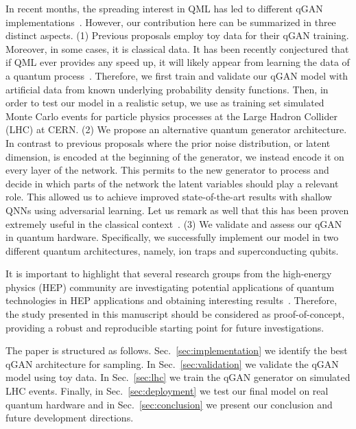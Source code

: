 \documentclass[twocolumn,preprintnumbers,superscriptaddress]{revtex4-2}
\begin{document}
In recent months, the spreading interest in QML has led to different qGAN
implementations~\cite{zoufal2019quantum, zeng2019learning, situ2020quantum,
  hu2019quantum, benedetti2019adversarial, romero2021variational,
  niu2021entangling}. However, our contribution here can be summarized in three
distinct aspects. (1) Previous proposals employ toy data for their qGAN
training. Moreover, in some cases, it is classical data. It has been recently
conjectured that if QML ever provides any speed up, it will likely appear from
learning the data of a quantum process~\cite{huang2021information,
  kubler2021inductive}. Therefore, we first train and validate our qGAN model with
artificial data from known underlying probability density functions. Then, in
order to test our model in a realistic setup, we use as training set simulated
Monte Carlo events for particle physics processes at the Large Hadron Collider
(LHC) at CERN. (2) We propose an alternative quantum generator architecture. In contrast to
previous proposals where the prior noise distribution, or latent dimension, is
encoded at the beginning of the generator, we instead encode it on every layer
of the network. This permits to the new generator to process and decide in which
parts of the network the latent variables should play a relevant role. This
allowed us to achieve improved state-of-the-art results with shallow QNNs using
adversarial learning. Let us remark as well that this has been proven extremely
useful in the classical context~\cite{karras2019style}. (3) We validate and
assess our qGAN in quantum hardware. Specifically, we successfully implement our
model in two different quantum architectures, namely, ion traps and
superconducting qubits.

It is important to highlight that several research groups from the high-energy
physics (HEP) community are investigating potential applications of quantum
technologies in HEP applications and obtaining interesting
results~\cite{P_rez_Salinas_2021,Guan_2021,chang2021quantum,Chang_2021,Belis_2021,khattak2021fast}.
Therefore, the study presented in this manuscript should be considered as
proof-of-concept, providing a robust and reproducible starting point for future
investigations.

The paper is structured as follows. Sec.~\ref{sec:implementation} we identify
the best qGAN architecture for sampling. In Sec.~\ref{sec:validation} we
validate the qGAN model using toy data. In Sec.~\ref{sec:lhc} we train the qGAN
generator on simulated LHC events. Finally, in Sec.~\ref{sec:deployment} we test
our final model on real quantum hardware and in Sec.~\ref{sec:conclusion} we
present our conclusion and future development directions.
\end{document}
